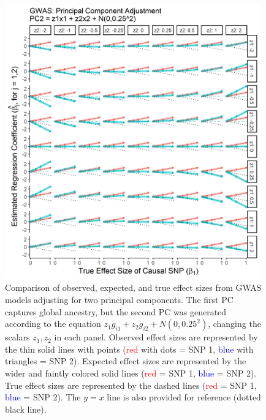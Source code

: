 \documentclass[12pt]{article}
\begin{document}
\begin{figure}[!htb]
\centering
\includegraphics[width=0.98\textwidth]{figs/theorysims/sims_pcs_gwas}
\caption[Observed versus expected and true effect sizes from principal component adjusted GWAS models.]%
{Comparison of observed, expected, and true effect sizes from GWAS models adjusting for two principal components. 
The first PC captures global ancestry, but the second PC was generated according to the equation $z_1 g_{i1} + z_2 g_{i2} + N(0, 0.25^2)$, changing the scalars $z_1,z_2$ in each panel.
Observed effect sizes  are represented by the thin solid lines with points (\textcolor{red}{red} with dots = SNP 1, \textcolor{blue}{blue} with triangles = SNP 2). 
Expected effect sizes  are represented by the wider and faintly colored solid lines (\textcolor{red}{red} = SNP 1, \textcolor{blue}{blue} = SNP 2).
True effect sizes are represented by the dashed lines (\textcolor{red}{red} = SNP 1, \textcolor{blue}{blue} = SNP 2).
The $y = x$ line is also provided for reference (dotted black line).}
\label{fig:pcs_gwas}
\end{figure}
\end{document}
